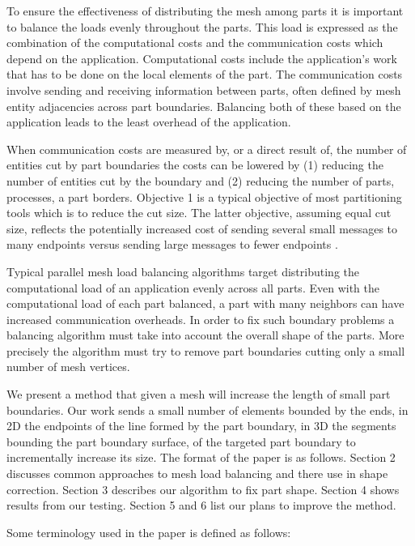 \documentclass{thesis}
\begin{document}
To ensure the effectiveness of distributing the mesh among parts it is 
important to balance the loads evenly throughout the parts. This load is 
expressed as the combination of the computational costs and the communication 
costs which depend on the application. Computational costs include the 
application's work that has to be done on the local elements of the part. The 
communication costs involve sending and receiving information between parts, 
often defined by mesh entity adjacencies across part boundaries. Balancing 
both of these based on the application leads to the least overhead of the 
application.

When communication costs are measured by, or a direct result of, the number 
of entities cut by part boundaries the costs can be lowered by (1) reducing 
the number of entities cut by the boundary and (2) reducing the number of 
parts, processes, a part borders. Objective 1 is a typical objective of most 
partitioning tools which is to reduce the cut size. The latter objective, 
assuming equal cut size, reflects the potentially increased cost of sending 
several small messages to many endpoints versus sending large 
messages to fewer endpoints \cite{MPIpresent,MPImessage}. 

Typical parallel mesh load balancing algorithms target distributing the 
computational load of an application evenly across all parts. Even with the 
computational load of each part balanced, a part with many neighbors can have 
increased communication overheads. In order to fix such boundary problems a 
balancing algorithm must take into account the overall shape of the parts. 
More precisely the algorithm must try to remove part boundaries cutting only a 
small number of mesh vertices.

We present  a method that given a mesh will 
increase the length of small part boundaries. Our work 
sends a small number of elements bounded by the ends, in 2D the endpoints of 
the line formed by the part boundary, in 3D the segments bounding the part 
boundary surface, of the targeted part boundary to incrementally increase its 
size. The format of the paper is as follows. Section 2 
discusses common approaches to mesh load balancing and there use in shape 
correction. Section 3 describes our algorithm to fix part shape. Section 4 
shows results from our testing. Section 5 and 6 list our plans to improve the 
method. 

Some terminology used in the paper is defined as follows:
\end{document}
